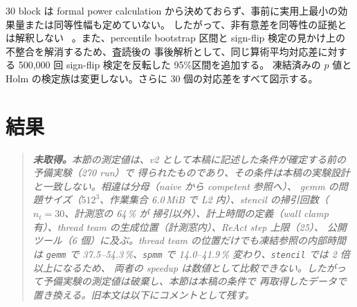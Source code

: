 \documentclass[conference,letterpaper]{IEEEtran}
\begin{document}
30 block は formal power calculation から決めておらず、事前に実用上最小の効果量または同等性幅も定めていない。
したがって、非有意差を同等性の証拠とは解釈しない
~\cite{lakens}。また、percentile bootstrap 区間と sign-flip 検定の見かけ上の不整合を解消するため、査読後の
事後解析として、同じ算術平均対応差に対する 500,000 回 sign-flip 検定を反転した 95\%区間を追加する。
凍結済みの $p$ 値と Holm の検定族は変更しない。さらに 30 個の対応差をすべて図示する。
\section{結果}

\begin{quote}\itshape
\textbf{未取得。}本節の測定値は、v2 として本稿に記述した条件が確定する前の予備実験（270 run）で
得られたものであり、その条件は本稿の実験設計と一致しない。相違は分母（naive から competent 参照へ）、
gemm の問題サイズ（$512^3$、作業集合 6.0\,MiB で L2 内）、stencil の掃引回数（$n_t=30$、計測窓の 64\,\% が
掃引以外）、計上時間の定義（wall clamp 有）、thread team の生成位置（計測窓内）、ReAct step 上限（25）、
公開ツール（6 個）に及ぶ。thread team の位置だけでも凍結参照の内部時間は
\texttt{gemm} で 37.5--54.3\,\%、\texttt{spmm} で 14.0--41.9\,\% 変わり、\texttt{stencil} では 2 倍以上になるため、
両者の speedup は数値として比較できない。したがって予備実験の測定値は破棄し、本節は本稿の条件で
再取得したデータで置き換える。旧本文は以下にコメントとして残す。
\end{quote}


\end{document}
